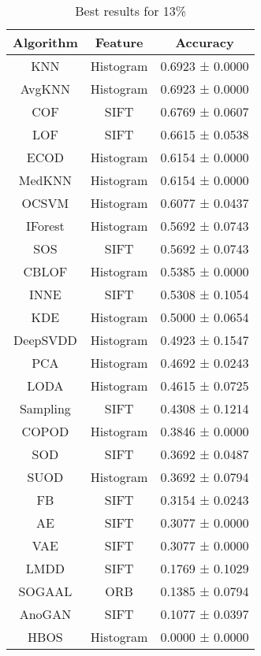 \documentclass{article}
\begin{document}
\begin{table}[]
\centering\begin{tabular}{c|c|c}
\toprule
Algorithm & Feature & Accuracy \\
\midrule
KNN & Histogram & 0.6923 ± 0.0000 \\
AvgKNN & Histogram & 0.6923 ± 0.0000 \\
COF & SIFT & 0.6769 ± 0.0607 \\
LOF & SIFT & 0.6615 ± 0.0538 \\
ECOD & Histogram & 0.6154 ± 0.0000 \\
MedKNN & Histogram & 0.6154 ± 0.0000 \\
OCSVM & Histogram & 0.6077 ± 0.0437 \\
IForest & Histogram & 0.5692 ± 0.0743 \\
SOS & SIFT & 0.5692 ± 0.0743 \\
CBLOF & Histogram & 0.5385 ± 0.0000 \\
INNE & SIFT & 0.5308 ± 0.1054 \\
KDE & Histogram & 0.5000 ± 0.0654 \\
DeepSVDD & Histogram & 0.4923 ± 0.1547 \\
PCA & Histogram & 0.4692 ± 0.0243 \\
LODA & Histogram & 0.4615 ± 0.0725 \\
Sampling & SIFT & 0.4308 ± 0.1214 \\
COPOD & Histogram & 0.3846 ± 0.0000 \\
SOD & SIFT & 0.3692 ± 0.0487 \\
SUOD & Histogram & 0.3692 ± 0.0794 \\
FB & SIFT & 0.3154 ± 0.0243 \\
AE & SIFT & 0.3077 ± 0.0000 \\
VAE & SIFT & 0.3077 ± 0.0000 \\
LMDD & SIFT & 0.1769 ± 0.1029 \\
SOGAAL & ORB & 0.1385 ± 0.0794 \\
AnoGAN & SIFT & 0.1077 ± 0.0397 \\
HBOS & Histogram & 0.0000 ± 0.0000 \\
\bottomrule
\end{tabular}
\caption{Best results for 13\%}
\label{tab:my_label}
\end{table}
\end{document}
